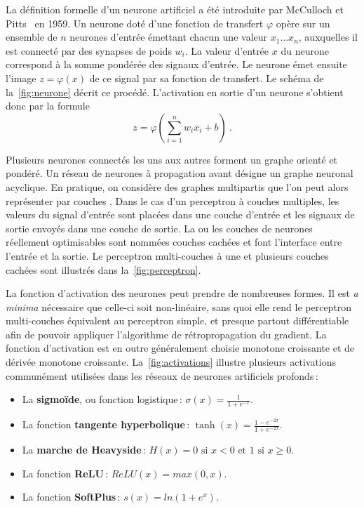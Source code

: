 La définition formelle d'un neurone artificiel a été introduite par McCulloch et Pitts~\cite{lettvin_what_1959} en 1959. Un neurone doté d'une fonction de transfert $\varphi$ opère sur un ensemble de $n$ neurones d'entrée émettant chacun une valeur $x_1\dots{}x_n$, auxquelles il est connecté par des synapses de poids $w_i$. La valeur d'entrée $x$ du neurone correspond à la somme pondérée des signaux d'entrée. Le neurone émet ensuite l'image $z = \varphi(x)$ de ce signal par sa fonction de transfert. Le schéma de la~\cref{fig:neurone} décrit ce procédé. L'activation en sortie d'un neurone s'obtient donc par la formule
$$z = \varphi\left(\sum_{i=1}^n w_i x_i + b\right)~.$$

Plusieurs neurones connectés les uns aux autres forment un graphe orienté et pondéré. Un réseau de neurones à propagation avant désigne un graphe neuronal acyclique. En pratique, on considère des graphes multipartis que l'on peut alors représenter par \fg couches \og{}. Dans le cas d'un perceptron à couches multiples, les valeurs du signal d'entrée sont placées dans une couche d'entrée et les signaux de sortie envoyés dans une couche de sortie. La ou les couches de neurones réellement optimisables sont nommées \og couches cachées \fg{} et font l'interface entre l'entrée et la sortie. Le perceptron multi-couches à une et plusieurs couches cachées sont illustrés dans la~\cref{fig:perceptron}.

La fonction d'activation des neurones peut prendre de nombreuses formes. Il est \emph{a minima} nécessaire que celle-ci soit non-linéaire, sans quoi elle rend le perceptron multi-couches équivalent au perceptron simple, et presque partout différentiable afin de pouvoir appliquer l'algorithme de rétropropagation du gradient. La fonction d'activation est en outre généralement choisie monotone croissante et de dérivée monotone croissante. La~\cref{fig:activations} illustre plusieurs activations communément utilisées dans les réseaux de neurones artificiels profonds\,:
\begin{itemize}
  \item La \textbf{sigmoïde}, ou fonction logistique\,: $\sigma(x) = \frac{1}{1 + e^{-x}}$.
  \item La fonction \textbf{tangente hyperbolique}\,: $\tanh(x) = \frac{1 - e^{-2x}}{1 + e^{-2x}}$.
  \item La \textbf{marche de Heavyside}\,: $H(x) = 0 \text{ si } x < 0 \text{ et } 1 \text{ si } x \geq 0$.
  \item La fonction \textbf{\gls{ReLU}}\,: $ReLU(x) = max(0,x)$.
  \item La fonction \textbf{SoftPlus}\,: $s(x) = ln(1 + e^x)$.
\end{itemize}


